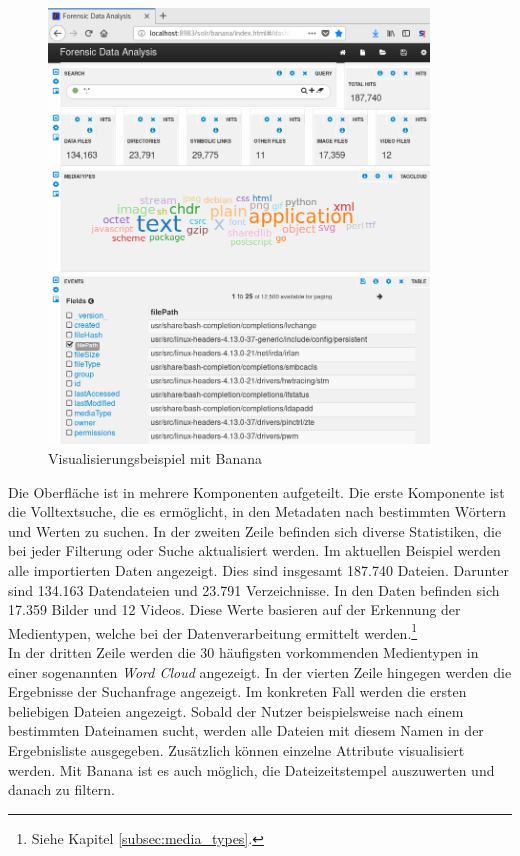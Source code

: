 \begin{figure}[ht]
  \centering
  \includegraphics[width=0.9\textwidth]{./resource/forensicDataAnalysisUI.png}
  \caption{Visualisierungsbeispiel mit Banana}
  \label{fig:banana_visualization}
\end{figure}

\noindent
Die Oberfläche ist in mehrere Komponenten aufgeteilt. Die erste Komponente ist die Volltextsuche, die es ermöglicht, in den Metadaten nach bestimmten Wörtern und Werten zu suchen. In der zweiten Zeile befinden sich diverse Statistiken, die bei jeder Filterung oder Suche aktualisiert werden. 
Im aktuellen Beispiel werden alle importierten Daten angezeigt. Dies sind insgesamt 187.740 Dateien. Darunter sind 134.163 Datendateien und 23.791 Verzeichnisse. In den Daten befinden sich 17.359 Bilder und 12 Videos. Diese Werte basieren auf der Erkennung der Medientypen, welche bei der Datenverarbeitung ermittelt werden.\footnote{Siehe Kapitel \ref{subsec:media_types}.}\\

\noindent
In der dritten Zeile werden die 30 häufigsten vorkommenden Medientypen in einer sogenannten \textit{Word Cloud} angezeigt. In der vierten Zeile hingegen werden die Ergebnisse der Suchanfrage angezeigt. Im konkreten Fall werden die ersten beliebigen Dateien angezeigt. 
Sobald der Nutzer beispielsweise nach einem bestimmten Dateinamen sucht, werden alle Dateien mit diesem Namen in der Ergebnisliste ausgegeben. Zusätzlich können einzelne Attribute visualisiert werden. Mit Banana ist es auch möglich, die Dateizeitstempel auszuwerten und danach zu filtern.\\

